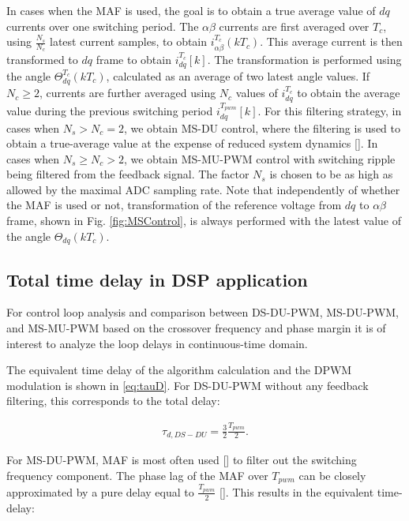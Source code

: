 \documentclass[journal]{IEEEtran}
\begin{document}
In cases when the MAF is used, the goal is to obtain a true average value of $dq$ currents over one switching period. The $\alpha \beta$ currents are first averaged over $T_c$, using $\frac{N_s}{N_c}$ latest current samples, to obtain $i_{\alpha \beta}^{T_c} (kT_c)$. This average current is then transformed to $dq$ frame to obtain $i_{dq}^{T_c} [k]$. The transformation is performed using the angle $\Theta_{dq}^{T_c}(kT_c)$, calculated as an average of two latest angle values. If $N_c\geq 2$, currents are further averaged using $N_c$ values of $i_{dq}^{T_c}$ to obtain the average value during the previous switching period $i_{dq}^{T_{pwm}}[k]$.
For this filtering strategy, in cases when $N_s>N_c = 2$, we obtain MS-DU control, where the filtering is used to obtain a true-average value at the expense of reduced system dynamics []. In cases when $N_s \geq N_c > 2$, we obtain MS-MU-PWM control with switching ripple being filtered from the feedback signal. The factor $N_s$ is chosen to be as high as allowed by the maximal ADC sampling rate.
Note that independently of whether the MAF is used or not, transformation of the reference voltage from $dq$ to $\alpha \beta$ frame, shown in Fig. \ref{fig:MSControl}, is always performed with the latest value of the angle $\Theta_{dq}(kT_c)$.

\subsection{Total time delay in DSP application}

For control loop analysis and comparison between DS-DU-PWM, MS-DU-PWM, and MS-MU-PWM based on the crossover frequency and phase margin it is of interest to analyze the loop delays in continuous-time domain.

The equivalent time delay of the algorithm calculation and the DPWM modulation is shown in \eqref{eq:tauD}. For DS-DU-PWM without any feedback filtering, this corresponds to the total delay:

\begin{equation}
\begin{aligned}
\tau_{d,DS-DU} = \frac{3}{2} \frac{T_{pwm}}{2}.
\label{eq:tauDSDU} 
\end{aligned}    
\end{equation}

For MS-DU-PWM, MAF is most often used [] to filter out the switching frequency component. The phase lag of the MAF over $T_{pwm}$ can be closely approximated by a pure delay equal to $\frac{T_{pwm}}{2}$ []. This results in the equivalent time-delay:
\end{document}
